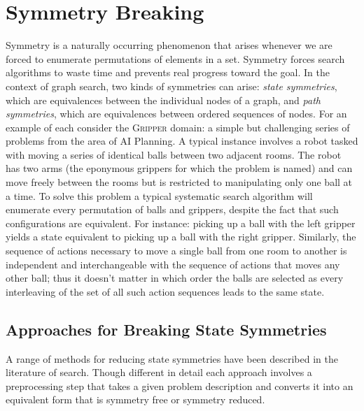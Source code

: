 \section{Symmetry Breaking}
\label{cha::lit::symmetry}
Symmetry is a naturally occurring phenomenon that arises whenever we are
forced to enumerate permutations of elements in a set. Symmetry forces search
algorithms to waste time and prevents real progress toward the goal.  In the
context of graph search, two kinds of symmetries can arise: \emph{state
symmetries}, which are equivalences between the individual nodes of a graph,
and \emph{path symmetries}, which are equivalences between ordered sequences
of nodes.  For an example of each consider the \textsc{Gripper} domain: a
simple but challenging series of problems from the area of AI Planning. A
typical instance involves a robot tasked with moving a series of identical
balls between two adjacent rooms.  The robot has two arms (the eponymous
grippers for which the problem is named) and can move freely between the rooms
but is restricted to manipulating only one ball at a time.  To solve this
problem a typical systematic search algorithm will enumerate every permutation
of balls and grippers, despite the fact that such configurations are
equivalent.  For instance: picking up a ball with the left gripper yields a
state equivalent to picking up a ball with the right gripper.
 Similarly, the sequence of actions necessary to move a single ball from one
 room to another
is independent and interchangeable with the sequence of actions that moves any
other ball; thus it doesn't matter in which order the balls are selected as
every interleaving of the set of all such action sequences leads to the same
state.

\subsection{Approaches for Breaking State Symmetries}
\label{cha::lit::symmetry::state}
A range of methods for reducing state symmetries have been described in the
literature of search. Though different in detail each approach involves a
preprocessing step that takes a given problem description and converts it into
an equivalent form that is symmetry free or symmetry reduced.


